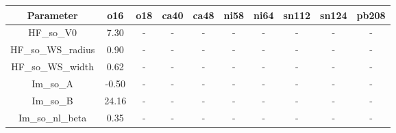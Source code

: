 \begin{tabular}{|c||c||c||c||c||c||c||c||c||c|} 
 \hline 
\bf{Parameter}& \bf{o16}& \bf{o18}& \bf{ca40}& \bf{ca48}& \bf{ni58}& \bf{ni64}& \bf{sn112}& \bf{sn124}& \bf{pb208}\\
 \hline
 \hline 
HF\_so\_V0 & 7.30 & - & - & - & - & - & - & - & -\\
HF\_so\_WS\_radius & 0.90 & - & - & - & - & - & - & - & -\\
HF\_so\_WS\_width & 0.62 & - & - & - & - & - & - & - & -\\
Im\_so\_A & -0.50 & - & - & - & - & - & - & - & -\\
Im\_so\_B & 24.16 & - & - & - & - & - & - & - & -\\
Im\_so\_nl\_beta & 0.35 & - & - & - & - & - & - & - & -\\

 \hline 
\end{tabular}